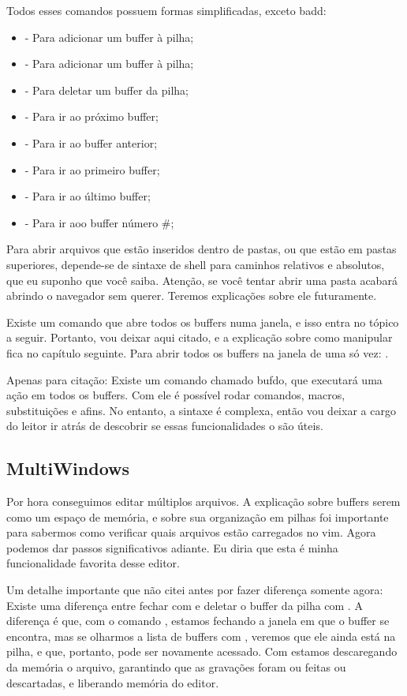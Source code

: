 \documentclass[a4paper, 12pt]{article}
\begin{document}
Todos esses comandos possuem formas simplificadas, exceto badd:
\begin{itemize}
    \item {} - Para adicionar um buffer à pilha;
    \item {} - Para adicionar um buffer à pilha;
    \item {} - Para deletar um buffer da pilha;
    \item {} - Para ir ao próximo buffer;
    \item {} - Para ir ao buffer anterior;
    \item {} - Para ir ao primeiro buffer;
    \item {} - Para ir ao último buffer;
    \item {} - Para ir aoo buffer número \#;
\end{itemize}

Para abrir arquivos que estão inseridos dentro de pastas, ou que estão em pastas superiores,
depende-se de sintaxe de shell para caminhos relativos e absolutos, que eu suponho que você saiba.
Atenção, se você tentar abrir uma pasta acabará abrindo o navegador sem querer.
Teremos explicações sobre ele futuramente.

Existe um comando que abre todos os buffers numa janela, e isso entra no tópico a seguir.
Portanto, vou deixar aqui citado, e a explicação sobre como manipular fica no capítulo seguinte.
Para abrir todos os buffers na janela de uma só vez: .

Apenas para citação: Existe um comando chamado bufdo, que executará uma ação em todos os buffers.
Com ele é possível rodar comandos, macros, substituições e afins.
No entanto, a sintaxe é complexa, então vou deixar a cargo do leitor ir atrás de descobrir
se essas funcionalidades o são úteis.

\subsection{MultiWindows}
Por hora conseguimos editar múltiplos arquivos.
A explicação sobre buffers serem como um espaço de memória, e sobre sua organização em pilhas
foi importante para sabermos como verificar quais arquivos estão carregados no vim.
Agora podemos dar passos significativos adiante.
Eu diria que esta é minha funcionalidade favorita desse editor.

Um detalhe importante que não citei antes por fazer diferença somente agora:
Existe uma diferença entre fechar com  e deletar o buffer da pilha com .
A diferença é que, com o comando , estamos fechando a janela em que o buffer se encontra,
mas se olharmos a lista de buffers com , veremos que ele ainda está na pilha, e que,
portanto, pode ser novamente acessado.
Com  estamos descaregando da memória o arquivo, garantindo que as gravações foram ou feitas ou descartadas,
e liberando memória do editor.
\end{document}

